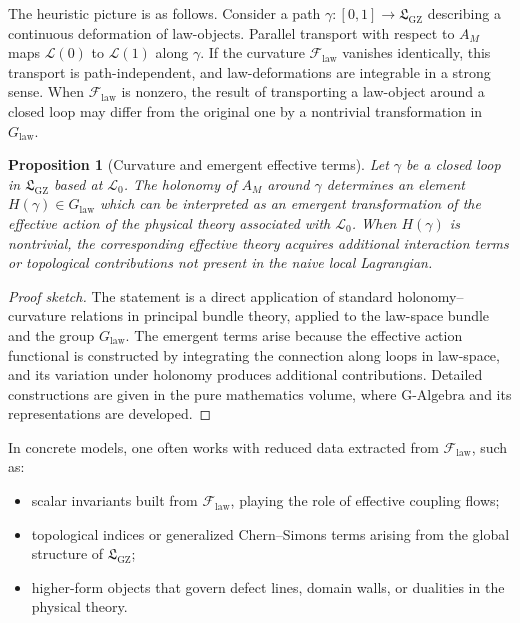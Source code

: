 \documentclass[11pt]{book}
\newcommand{\GAlgebra}{\text{G-Algebra}}
\newcommand{\GZLS}{\ensuremath{\mathfrak{L}_{\mathrm{GZ}}}}
\newcommand{\GZLOC}{\ensuremath{A_M}}
\newcommand{\GZLCurv}{\ensuremath{\mathcal{F}_{\mathrm{law}}}}
\theoremstyle{plain}
\newtheorem{proposition}[theorem]{Proposition}
\theoremstyle{definition}
\theoremstyle{remark}
\begin{document}
The heuristic picture is as follows. Consider a path
$\gamma : [0,1] \to \GZLS$ describing a continuous deformation of
law-objects. Parallel transport with respect to $\GZLOC$ maps
$\mathcal{L}(0)$ to $\mathcal{L}(1)$ along $\gamma$. If the curvature
$\GZLCurv$ vanishes identically, this transport is path-independent,
and law-deformations are integrable in a strong sense. When
$\GZLCurv$ is nonzero, the result of transporting a law-object around
a closed loop may differ from the original one by a nontrivial
transformation in $G_{\mathrm{law}}$.

\begin{proposition}[Curvature and emergent effective terms]
  Let $\gamma$ be a closed loop in $\GZLS$ based at $\mathcal{L}_0$.
  The holonomy of $\GZLOC$ around $\gamma$ determines an element
  $H(\gamma) \in G_{\mathrm{law}}$ which can be interpreted as an
  emergent transformation of the effective action of the physical
  theory associated with $\mathcal{L}_0$. When $H(\gamma)$ is
  nontrivial, the corresponding effective theory acquires additional
  interaction terms or topological contributions not present in the
  naive local Lagrangian.
\end{proposition}

\begin{proof}[Proof sketch]
  The statement is a direct application of standard holonomy--curvature
  relations in principal bundle theory, applied to the law-space bundle
  and the group $G_{\mathrm{law}}$. The emergent terms arise because
  the effective action functional is constructed by integrating the
  connection along loops in law-space, and its variation under
  holonomy produces additional contributions. Detailed constructions
  are given in the pure mathematics volume, where $\GAlgebra$ and
  its representations are developed.
\end{proof}

In concrete models, one often works with reduced data extracted from
$\GZLCurv$, such as:
\begin{itemize}
  \item scalar invariants built from $\GZLCurv$, playing the role
        of effective coupling flows;
  \item topological indices or generalized Chern--Simons terms arising
        from the global structure of $\GZLS$;
  \item higher-form objects that govern defect lines, domain walls,
        or dualities in the physical theory.
\end{itemize}
\end{document}
